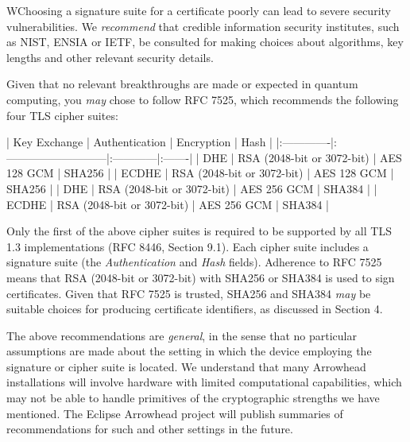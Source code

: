 %
%

WChoosing a signature suite for a certificate poorly can lead to severe security vulnerabilities.
We \textit{recommend} that credible information security institutes, such as NIST, ENSIA or IETF, be consulted for making choices about algorithms, key lengths and other relevant security details.

Given that no relevant breakthroughs are made or expected in quantum computing, you \textit{may} chose to follow RFC 7525, which recommends the following four TLS cipher suites:

| Key Exchange | Authentication             | Encryption  | Hash   |
|:-------------|:---------------------------|:------------|:-------|
| DHE          | RSA (2048-bit or 3072-bit) | AES 128 GCM | SHA256 |
| ECDHE        | RSA (2048-bit or 3072-bit) | AES 128 GCM | SHA256 |
| DHE          | RSA (2048-bit or 3072-bit) | AES 256 GCM | SHA384 |
| ECDHE        | RSA (2048-bit or 3072-bit) | AES 256 GCM | SHA384 |

Only the first of the above cipher suites is required to be supported by all TLS 1.3 implementations (RFC 8446, Section 9.1).
Each cipher suite includes a signature suite (the \textit{Authentication} and \textit{Hash} fields).
Adherence to RFC 7525 means that RSA (2048-bit or 3072-bit) with SHA256 or SHA384 is used to sign certificates.
Given that RFC 7525 is trusted, SHA256 and SHA384 \textit{may} be suitable choices for producing certificate identifiers, as discussed in Section 4.

The above recommendations are \textit{general}, in the sense that no particular assumptions are made about the setting in which the device employing the signature or cipher suite is located.
We understand that many Arrowhead installations will involve hardware with limited computational capabilities, which may not be able to handle primitives of the cryptographic strengths we have mentioned.
The Eclipse Arrowhead project will publish summaries of recommendations for such and other settings in the future.